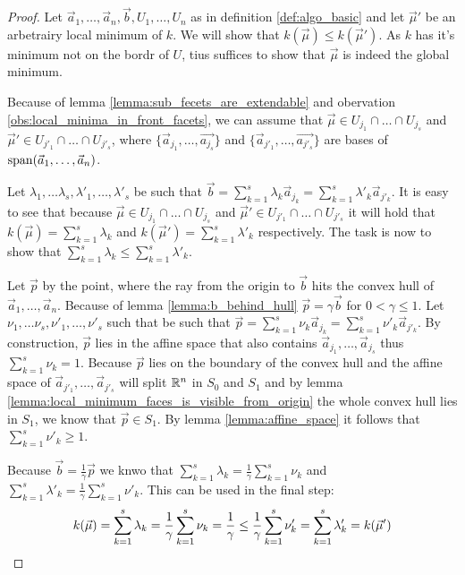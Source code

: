 \begin{proof}
    Let $\vec a_1, \dots, \vec a_n, \vec b, U_1, \dots, U_n$ as in definition \ref{def:algo_basic} and let $\vec\mu'$ be an arbetrairy local minimum of $k$. We will show that $k(\vec\mu) \leq k(\vec\mu')$. As $k$ has it's minimum not on the bordr of $U$, tius suffices to show that $\vec\mu$ is indeed the global minimum.

    Because of lemma \ref{lemma:sub_fecets_are_extendable} and obervation \ref{obs:local_minima_in_front_facets}, we can assume that $\vec\mu \in U_{j_1} \cap \dots \cap U_{j_s}$ and $\vec\mu' \in U_{j'_1} \cap \dots \cap U_{j'_s}$, where $\{\vec a_{j_1}, \dots, \vec {a_{j_s}}\}$ and $\{\vec a_{j'_1}, \dots, \vec {a_{j'_s}}\}$ are bases of $\operatorname{span}(\vec a_1, \dots, \vec a_n)$.
    
    Let $\lambda_1, \dots \lambda_s, \lambda'_1, \dots, \lambda'_s$ be such that $\vec b = \sum_{k=1}^{s}\lambda_k \vec a_{j_k} = \sum_{k=1}^{s}\lambda'_k \vec a_{j'_k}$. It is easy to see that because $\vec\mu \in U_{j_1} \cap \dots \cap U_{j_s}$ and $\vec\mu' \in U_{j'_1} \cap \dots \cap U_{j'_s}$ it will hold that $k(\vec\mu) = \sum_{k=1}^{s}\lambda_k$ and $k(\vec\mu') = \sum_{k=1}^{s}\lambda'_k$ respectively. The task is now to show that $\sum_{k=1}^{s}\lambda_k \leq \sum_{k=1}^{s}\lambda'_k$.

    Let $\vec p$ by the point, where the ray from the origin to $\vec b$ hits the convex hull of $\vec a_1, \dots, \vec a_n$. Because of lemma \ref{lemma:b_behind_hull} $\vec p = \gamma\vec b$ for $0 < \gamma \leq 1$. Let $\nu_1, \dots \nu_s, \nu'_1, \dots, \nu'_s$ such that be such that $\vec p = \sum_{k=1}^{s}\nu_k \vec a_{j_k} = \sum_{k=1}^{s}\nu'_k \vec a_{j'_k}$. By construction, $\vec p$ lies in the affine space that also contains $\vec a_{j_1}, \dots, \vec a_{j_s}$ thus $\sum_{k=1}^{s}\nu_k = 1$. Because $\vec p$ lies on the boundary of the convex hull and the affine space of $\vec a_{j'_1}, \dots, \vec a_{j'_s}$ will split $\mathbb{R}^n$ in $S_0$ and $S_1$ and by lemma \ref{lemma:local_minimum_faces_is_visible_from_origin} the whole convex hull lies in $S_1$, we know that $\vec p\in S_1$. By lemma \ref{lemma:affine_space} it follows that $\sum_{k=1}^{s}\nu'_k \geq 1$.

    Because $\vec b = \frac{1}{\gamma}\vec p$ we knwo that $\sum_{k=1}^{s}\lambda_k = \frac{1}{\gamma} \sum_{k=1}^{s}\nu_k$ and $\sum_{k=1}^{s}\lambda'_k = \frac{1}{\gamma} \sum_{k=1}^{s}\nu'_k$. This can be used in the final step:
    \begin{equation*}
        k(\vec\mu) = \sum_{k=1}^{s}\lambda_k = \frac{1}{\gamma} \sum_{k=1}^{s}\nu_k = \frac{1}{\gamma} \leq \frac{1}{\gamma} \sum_{k=1}^{s}\nu'_k = \sum_{k=1}^{s}\lambda'_k = k(\vec\mu') \qedhere
    \end{equation*}
\end{proof}

